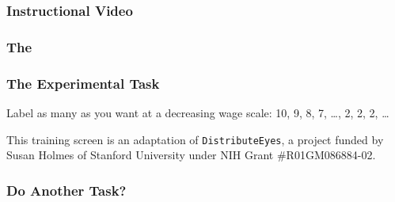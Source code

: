 \documentclass[slides]{beamer} %
\begin{document}
\begin{frame}\frametitle{Instructional Video}


\end{frame}

\begin{frame}\frametitle{The }


\end{frame}

\begin{frame}\frametitle{The Experimental Task}

Label as many as you want at a decreasing wage scale: 10\cent, 9\cent, 8\cent, 7\cent, \ldots, 2\cent, 2\cent, 2\cent, \ldots \pause
{}

 \pause


\vspace{-0.3cm}
\centering

\tiny This training screen is an adaptation of \texttt{DistributeEyes}, a project funded by Susan Holmes of Stanford University under NIH Grant \#R01GM086884-02.

\end{frame}

\begin{frame}\frametitle{Do Another Task?}


\end{frame}
\end{document}
